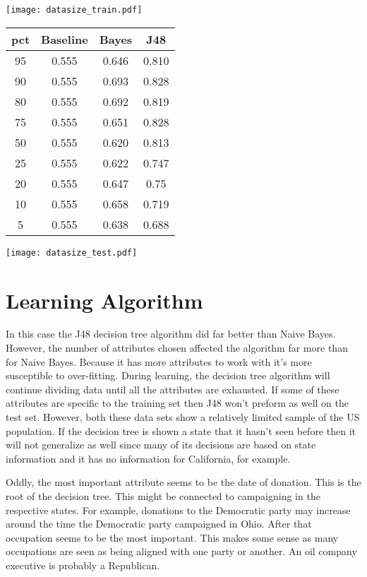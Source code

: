 \documentclass[10pt]{article}
\begin{document}
\texttt{[image: datasize\_train.pdf]}

\begin{table}[h]
\begin{center}
\begin{tabular}{|c|c|c|c|}
\hline
pct & Baseline & Bayes & J48 \\
 \hline\hline 
95 & 0.555 & 0.646 & 0.810 \\
90 & 0.555 & 0.693 & 0.828 \\
80 & 0.555 & 0.692 & 0.819 \\
75 & 0.555 & 0.651 & 0.828 \\
50 & 0.555 & 0.620 & 0.813 \\
25 & 0.555 & 0.622 & 0.747 \\
20 & 0.555 & 0.647 & 0.75 \\
10 & 0.555 & 0.658 & 0.719 \\
5 & 0.555 & 0.638 & 0.688 \\
\hline
\end{tabular}
\end{center}
\end{table}

\texttt{[image: datasize\_test.pdf]}

\section{Learning Algorithm}
In this case the J48 decision tree algorithm did far better than Naive Bayes.
However, the number of attributes chosen affected the algorithm far more than
for Naive Bayes.  Because it has more attributes to work with it's more 
susceptible to over-fitting.  During learning, the decision tree algorithm will 
continue dividing data until all the attributes are exhausted.  If some of 
these attributes are specific to the training set then J48 won't preform as
well on the test set.  However, both these data sets show a relatively limited
sample of the US population.  If the decision tree is shown a state that it
hasn't seen before then it will not generalize as well since many of its
decisions are based on state information and it has no information for 
California, for example.

Oddly, the most important attribute seems to be the date of donation.  This
is the root of the decision tree.  This might be connected to campaigning
in the respective states.  For example, donations to the Democratic party
may increase around the time the Democratic party campaigned in Ohio.  After
that occupation seems to be the most important.  This makes some sense as
many occupations are seen as being aligned with one party or another.  An oil
company executive is probably a Republican.
\end{document}
